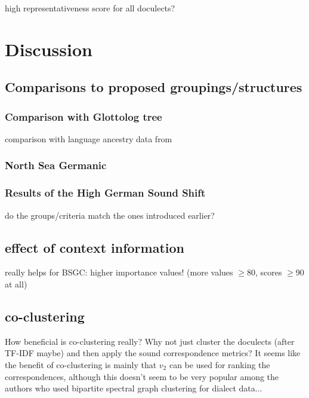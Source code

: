 \documentclass[a4paper]{article}
\begin{document}

high representativeness score for all doculects?


\section{Discussion}
\label{sec:discussion}


\subsection{Comparisons to proposed groupings/structures}
\subsubsection{Comparison with Glottolog tree}
comparison with language ancestry data from \citet{hammarstroem2018glottolog}

\subsubsection{North Sea Germanic}

\subsubsection{Results of the High German Sound Shift}

do the groups/criteria match the ones introduced earlier?

\subsection{effect of context information}

really helps for BSGC: higher importance values! (more values $\geq$80, scores $\geq$90 at all)

\subsection{co-clustering}
How beneficial is co-clustering really? Why not just cluster the doculects (after TF-IDF maybe) and then apply the sound correspondence metrics? It seems like the benefit of co-clustering is mainly that $v_2$ can be used for ranking the correspondences, although this doesn't seem to be very popular among the authors who used bipartite spectral graph clustering for dialect data...
\end{document}
